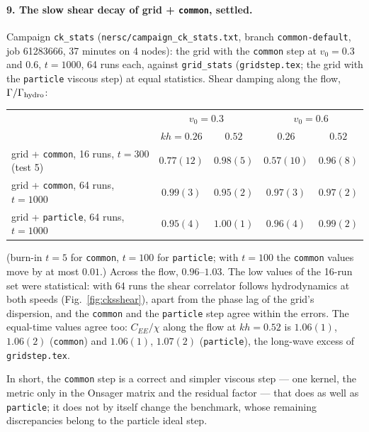 \documentclass[11pt,aps,preprint,nofootinbib,superscriptaddress,tightenlines]{revtex4-2}
\def\Fig#1{Fig.~\ref{#1}}
\let\oldparagraph\paragraph
\renewcommand{\paragraph}{\par\bigskip\oldparagraph}
\begin{document}
\paragraph{9. The slow shear decay of grid + \texttt{common}, settled.}  Campaign \texttt{ck\_stats} (\texttt{nersc/campaign\_ck\_stats.txt},
branch \texttt{common-default}, job 61283666, 37 minutes on 4 nodes): the grid with the \texttt{common} step at $v_0=0.3$ and
$0.6$, $t=1000$, 64 runs each, against \texttt{grid\_stats} (\texttt{gridstep.tex}; the grid with the \texttt{particle} viscous step) at equal
statistics.  Shear damping along the flow, $\Gamma/\Gamma_{\rm hydro}$:
\begin{center}
\begin{tabular}{lcccc}
\hline
 & \multicolumn{2}{c}{$v_0=0.3$} & \multicolumn{2}{c}{$v_0=0.6$} \\
 & $kh=0.26$ & $0.52$ & $0.26$ & $0.52$ \\ \hline
grid + \texttt{common}, 16 runs, $t=300$ (test 5) & $0.77(12)$ & $0.98(5)$ & $0.57(10)$ & $0.96(8)$ \\
grid + \texttt{common}, 64 runs, $t=1000$ & $0.99(3)$ & $0.95(2)$ & $0.97(3)$ & $0.97(2)$ \\
grid + \texttt{particle}, 64 runs, $t=1000$ & $0.95(4)$ & $1.00(1)$ & $0.96(4)$ & $0.99(2)$ \\
\hline
\end{tabular}
\end{center}
(burn-in $t=5$ for \texttt{common}, $t=100$ for \texttt{particle}; with $t=100$ the \texttt{common} values move by at most $0.01$.)
Across the flow, $0.96$--$1.03$.  The low values of the 16-run set were statistical: with 64 runs the shear
correlator follows hydrodynamics at both speeds (\Fig{fig:cksshear}), apart from the phase lag of the grid's
dispersion, and the \texttt{common} and the \texttt{particle} step agree within the errors.  The equal-time values
agree too: $C_{EE}/\chi$ along the flow at $kh=0.52$ is $1.06(1)$, $1.06(2)$ (\texttt{common}) and $1.06(1)$, $1.07(2)$ (\texttt{particle}), the
long-wave excess of \texttt{gridstep.tex}.

In short, the \texttt{common} step is a correct and simpler viscous step --- one kernel, the metric only in the
Onsager matrix and the residual factor --- that does as well as \texttt{particle}; it does not by itself change
the benchmark, whose remaining discrepancies belong to the particle ideal step.
\end{document}
